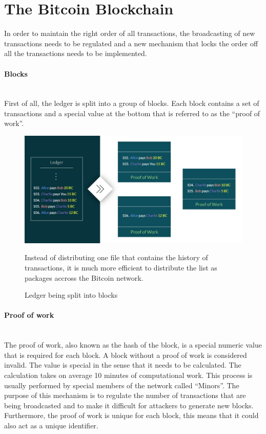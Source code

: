 \documentclass[a4paper, 12pt]{report}
\begin{document}
\section{The Bitcoin Blockchain}
\par In order to maintain the right order of all transactions, the broadcasting of new transactions needs to be regulated and a new mechanism that locks the order off all the transactions needs to be implemented.
\paragraph{Blocks} \hspace{0pt} \\
First of all, the ledger is split into a group of blocks. Each block contains a set of transactions and a special value at the bottom that is referred to as the “proof of work”. 

\begin{figure}[h]
	\includegraphics[width=\textwidth]{02_Ledger_Blocks}
	\caption{Ledger being split into blocks}
	\medskip
	\small Instead of distributing one file that contains the history of transactions, it is much more efficient to distribute the list as packages accross the Bitcoin network.
	\label{fig:02_Ledger_Blocks}
\end{figure}

\paragraph{Proof of work} \hspace{0pt} \\
The proof of work, also known as the hash of the block, is a special numeric value that is required for each block. A block without a proof of work is considered invalid. The value is special in the sense that it needs to be calculated. The calculation takes on average 10 minutes of computational work. This process is usually performed by special members of the network called “Minors”. The purpose of this mechanism is to regulate the number of transactions that are being broadcasted and to make it difficult for attackers to generate new blocks. Furthermore, the proof of work is unique for each block, this means that it could also act as a unique identifier.
\end{document}
